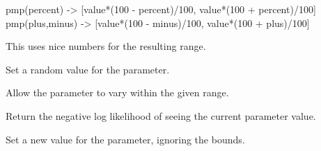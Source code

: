 \documentclass[letterpaper,10pt,english]{sphinxmanual}
\begin{document}
\begin{fulllineitems}
\begin{fulllineitems}
pmp(percent) -\textgreater{} {[}value*(100 - percent)/100, value*(100 + percent)/100{]}
pmp(plus,minus) -\textgreater{} {[}value*(100 - minus)/100, value*(100 + plus)/100{]}

This uses nice numbers for the resulting range.

\end{fulllineitems}


\begin{fulllineitems}
\label{api/mystic.parameter:refl1d.mystic.parameter.IntegerParameter.rand}
Set a random value for the parameter.

\end{fulllineitems}


\begin{fulllineitems}
\label{api/mystic.parameter:refl1d.mystic.parameter.IntegerParameter.range}
Allow the parameter to vary within the given range.

\end{fulllineitems}


\begin{fulllineitems}
\label{api/mystic.parameter:refl1d.mystic.parameter.IntegerParameter.residual}
Return the negative log likelihood of seeing the current parameter value.

\end{fulllineitems}


\begin{fulllineitems}
\label{api/mystic.parameter:refl1d.mystic.parameter.IntegerParameter.set}
Set a new value for the parameter, ignoring the bounds.

\end{fulllineitems}



\end{fulllineitems}
\end{document}
